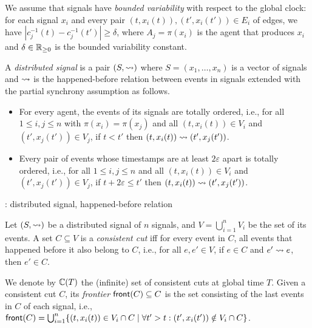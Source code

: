We assume that signals have \emph{bounded variability} with respect to the global clock: for each signal $x_i$ and every pair $(t, x_i(t)), (t', x_i(t')) \in E_i$ of edges, we have $|c_j^{-1}(t) - c_j^{-1}(t')| \geq \delta$, where $A_j = \pi(x_i)$ is the agent that produces $x_i$ and $\delta \in \mathbb{R}_{\geq 0}$ is the bounded variability constant.

\begin{definition} \label{defn:hb}
	A \emph{distributed signal} is a pair $(S, {\rightsquigarrow})$ where $S = (x_1, \ldots, x_n)$ is a vector of signals and ${\rightsquigarrow}$ is the happened-before relation between events in signals extended with the partial synchrony assumption as follows.
	\begin{itemize}
		\item For every agent, the events of its signals are totally ordered, i.e., for all $1 \leq i,j \leq n$ with $\pi(x_i) = \pi(x_j)$ and all $(t, x_i(t)) \in V_i$ and $(t', x_j(t')) \in V_j$, if $t < t'$ then $(t, x_i(t)) \rightsquigarrow (t', x_j(t'))$.
		\item Every pair of events whose timestamps are at least $2 \varepsilon$ apart is totally ordered, i.e., for all $1 \leq i,j \leq n$ and all $(t, x_i(t)) \in V_i$ and $(t', x_j(t')) \in V_j$, if $t + 2\varepsilon \leq t'$ then $(t, x_i(t)) \rightsquigarrow (t', x_j(t'))$.  
	\end{itemize}
\end{definition}

\begin{example}
	\TODO: distributed signal, happened-before relation
\end{example}

\begin{definition}
	Let $(S, {\rightsquigarrow})$ be a distributed signal of $n$ signals, and $V = \bigcup_{i = 1}^{n} V_i$ be the set of its events.
	A set $C \subseteq V$ is a \emph{consistent cut} iff for every event in $C$, all events that happened before  it also belong to $C$, i.e., for all $e, e' \in V$, if $e \in C$ and $e' \rightsquigarrow e$, then $e' \in C$.
\end{definition}

We denote by $\mathbb{C}(T)$ the (infinite) set of consistent cuts at global time $T$.
Given a consistent cut $C$, its \emph{frontier} $\mathsf{front}(C) \subseteq C$ is the set consisting of the last events in $C$ of each signal, i.e., $\fr(C) = \bigcup_{i = 1}^{n} \{ (t, x_i(t)) \in V_i \cap C \st \forall t' > t : (t', x_i(t')) \notin V_i \cap C \}$.

